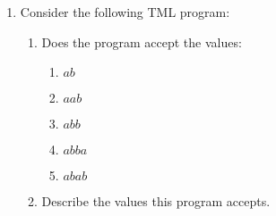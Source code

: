 \documentclass[answers]{exam}
\begin{document}
\begin{enumerate}
        \item Consider the following TML program:
        
        \begin{enumerate}
            \item Does the program accept the values:
            \begin{enumerate}
                \item $ab$
                \begin{solution}
                    
                \end{solution}
                \newpage
                
                \item $aab$
                \begin{solution}
                    
                \end{solution}
                
                \item $abb$
                \begin{solution}
                    
                \end{solution}
                
                \item $abba$
                \begin{solution}
                    
                \end{solution}
                
                \item $abab$
                \begin{solution}
                    
                \end{solution}
            \end{enumerate}
            
            \item Describe the values this program accepts.
            \begin{solution}
                \vspace*{30pt}
            \end{solution}
        \end{enumerate}
    \end{enumerate}
    
    \newpage
\end{document}
